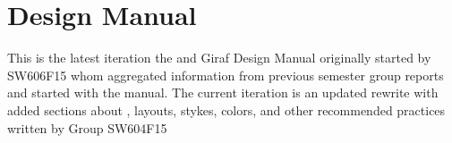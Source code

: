 \chapter{Design Manual}\label{app:design_manual}

This is the latest iteration the and Giraf Design Manual originally started by SW606F15 whom aggregated information from previous semester group reports and started with the manual. The current iteration is an updated rewrite with added sections about \gc, layouts, stykes, colors, and other recommended practices written by Group SW604F15  